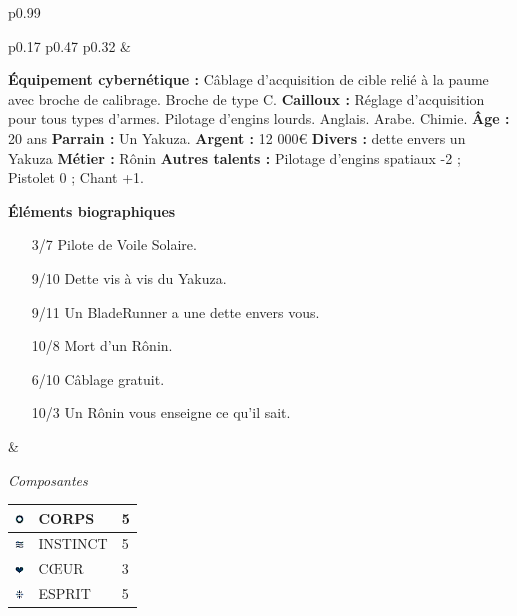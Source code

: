 \documentclass[11pt,twoside,a4paper]{article}
\def\imgCORPS{\includegraphics[width=0.25cm]{../../../../../imgGraphics/rolePlayingGame/SimulacreS/mini12x12/corps.png} }
\def\imgINSTI{\includegraphics[width=0.25cm]{../../../../../imgGraphics/rolePlayingGame/SimulacreS/mini12x12/instinct.png} }
\def\imgCOEUR{\includegraphics[width=0.25cm]{../../../../../imgGraphics/rolePlayingGame/SimulacreS/mini12x12/coeur.png} }
\def\imgESPRI{\includegraphics[width=0.25cm]{../../../../../imgGraphics/rolePlayingGame/SimulacreS/mini12x12/esprit.png} }
\begin{document}
\begin{longtable}[ht]{ p{} }
\begin{tabular}[h]{ p{} p{} p{} }
		& %
			
		\textbf{{\'E}quipement cybern{\'e}tique : }C{\^a}blage d'acquisition de cible reli{\'e} {\`a} la paume avec broche de calibrage. Broche de type C. \newline
		\textbf{Cailloux : }R{\'e}glage d'acquisition pour tous types d'armes. Pilotage d'engins lourds. Anglais. Arabe. Chimie. \newline
		\textbf{{\^A}ge : } 20 ans 											\newline
		\textbf{Parrain : } Un Yakuza. 										\newline
		\textbf{Argent : } 12 000\euro 										\newline
		\textbf{Divers : } dette envers un Yakuza							\newline
		\textbf{M{\'e}tier : } R{\^o}nin  									\newline
		\textbf{Autres talents : } Pilotage d'engins spatiaux -2 ; Pistolet 0 ; Chant +1. \newline
		
		\textbf{{\'E}l{\'e}ments biographiques}
		\begin{itemize}
			\item[3/7] Pilote de Voile Solaire. 
			\item[9/10] Dette vis {\`a} vis du Yakuza. 
			\item[9/11] Un BladeRunner a une dette envers vous. 
			\item[10/8] Mort d'un R{\^o}nin. 
			\item[6/10] C{\^a}blage gratuit. 
			\item[10/3] Un R{\^o}nin vous enseigne ce qu'il sait. 
		\end{itemize}
		
		& %
		
			{\centering \emph{Composantes}}	\newline
				{\footnotesize %
				\begin{tabular}[h]{|p{0.25cm}|p{3.00cm}|p{0.750cm}|}
					\hline
					\imgCORPS & CORPS		&	5	\\
					\hline
					\imgINSTI & INSTINCT	&	5	\\
					\hline
					\imgCOEUR & C\OE UR		&	3	\\
					\hline
					\imgESPRI & ESPRIT		&	5	\\
					\hline
				\end{tabular} }
			\newline
			

\end{tabular}
\end{longtable}
\end{document}
